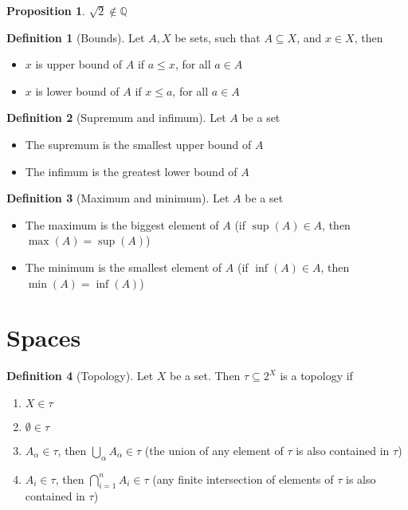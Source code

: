 \documentclass{article}
\newenvironment{enumrom}{\begin{enumerate}[label=(\roman*)]}{\end{enumerate}}
\theoremstyle{definition}
\newtheorem{definition}{Definition}[section]
\theoremstyle{definition}
\theoremstyle{plain}
\theoremstyle{plain}
\theoremstyle{plain}
\theoremstyle{plain}
\newtheorem{proposition}[theorem]{Proposition}
\theoremstyle{definition}
\theoremstyle{remark}
\theoremstyle{remark}
\theoremstyle{remark}
\theoremstyle{remark}
\newcommand{\Q}{\mathbb{Q}}
\begin{document}
\begin{proposition}
  $\sqrt{2} \notin \Q$
\end{proposition}



\begin{definition}[Bounds]
  Let $A, X$ be sets, such that $A \subseteq X$, and $x \in X$, then
  \begin{itemize}
  \item $x$ is upper bound of $A$ if $a \leq x$, for all $a \in A$
  \item $x$ is lower bound of $A$ if $x \leq a$, for all $a \in A$
  \end{itemize}
\end{definition}


\begin{definition}[Supremum and infimum]
  Let $A$ be a set
  \begin{itemize}
  \item The supremum is the smallest upper bound of $A$
  \item The infimum is the greatest lower bound of $A$
  \end{itemize}
\end{definition}


\begin{definition}[Maximum and minimum]
  Let $A$ be a set
  \begin{itemize}
  \item The maximum is the biggest element of $A$ (if $\sup(A) \in A$, then $\max(A) = \sup(A)$)
  \item The minimum is the smallest element of $A$ (if $\inf(A) \in A$, then $\min(A) = \inf(A)$)
  \end{itemize}
\end{definition}


\section{Spaces}


\begin{definition}[Topology]
  Let $X$ be a set. Then $\tau \subseteq 2^X$ is a topology if
  \begin{enumrom}
  \item $X \in \tau$
  \item $\emptyset \in \tau$
  \item $A_\alpha \in \tau$, then $\displaystyle \bigcup_\alpha A_\alpha \in \tau$ (the union of any element of $\tau$ is also contained in $\tau$)
  \item $A_i \in \tau$, then $\displaystyle \bigcap_{i = 1}^n A_i \in \tau$ (any finite intersection of elements of $\tau$ is also contained in $\tau$)
  \end{enumrom}
\end{definition}
\end{document}
